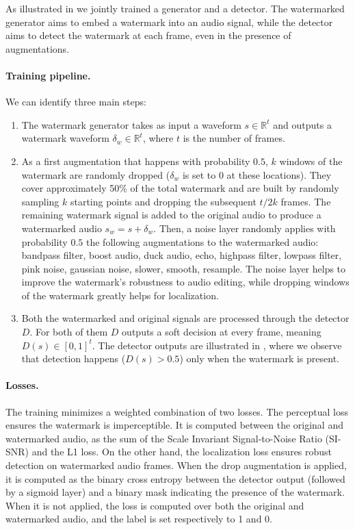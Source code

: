 As illustrated in  we jointly trained a generator and a detector.
The watermarked generator aims to embed a watermark into an audio signal, while the detector aims to detect the watermark at each frame, even in the presence of augmentations.

\paragraph{Training pipeline.} 
We can identify three main steps:
\begin{enumerate}[label=(\roman*), itemsep=4pt, topsep=4pt, leftmargin=20pt]
    \item The watermark generator takes as input a waveform $s \in \mathbb{R}^t$ and outputs a watermark waveform $\delta_w \in \mathbb{R}^t$, where $t$ is the number of frames.
    \item As a first augmentation that happens with probability $0.5$, $k$ windows of the watermark are randomly dropped ($\delta_w$ is set to 0 at these locations).
    They cover approximately 50\% of the total watermark and are built by randomly sampling $k$ starting points and dropping the subsequent $t/2k$ frames.
    The remaining watermark signal is added to the original audio to produce a watermarked audio $s_w = s + \delta_w$.
    Then, a noise layer randomly applies with probability $0.5$ the following augmentations to the watermarked audio: bandpass filter, boost audio, duck audio, echo, highpass filter, lowpass filter, pink noise, gaussian noise, slower, smooth, resample.
    The noise layer helps to improve the watermark's robustness to audio editing, while dropping windows of the watermark greatly helps for localization.
    \item Both the watermarked and original signals are processed through the detector $D$.
    For both of them $D$ outputs a soft decision at every frame, meaning $D(s) \in [0, 1]^t$.
    The detector outputs are illustrated in , where we observe that detection happens ($D(s)>0.5$) only when the watermark is present.
\end{enumerate}

\paragraph{Losses.} 
The training minimizes a weighted combination of two losses.
The perceptual loss ensures the watermark is imperceptible. 
It is computed between the original and watermarked audio, as the sum of the Scale Invariant Signal-to-Noise Ratio (SI-SNR) and the L1 loss.
On the other hand, the localization loss ensures robust detection on watermarked audio frames.
When the drop augmentation is applied, it is computed as the binary cross entropy between the detector output (followed by a sigmoid layer) and a binary mask indicating the presence of the watermark.
When it is not applied, the loss is computed over both the original and watermarked audio, and the label is set respectively to 1 and 0.


